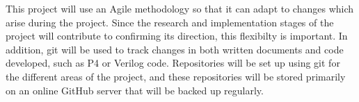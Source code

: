 

This project will use an Agile methodology so that it can adapt to changes which arise during the project. Since the research and implementation stages of the project will contribute to confirming its direction, this flexibilty is important. In addition, git \cite{git} will be used to track changes in both written documents and code developed, such as P4 or Verilog code. Repositories will be set up using git for the different areas of the project, and these repositories will be stored primarily on an online GitHub \cite{github} server that will be backed up regularly.
